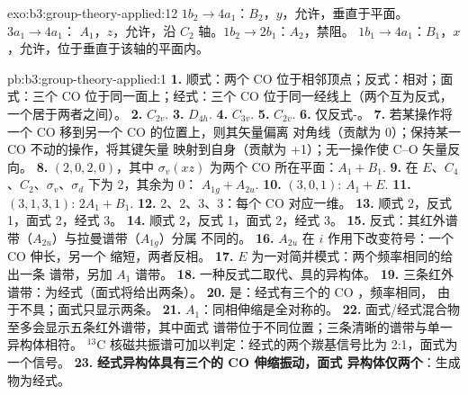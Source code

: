 \begin{solution}{exo:b3:group-theory-applied:12}
$1b_2 \to 4a_1$：$B_2$，$y$，允许，垂直于平面。$3a_1 \to 4a_1$：
$A_1$，$z$，允许，沿 $C_2$ 轴。$1b_2 \to 2b_1$：$A_2$，禁阻。
$1b_1 \to 4a_1$：$B_1$，$x$，允许，位于垂直于该轴的平面内。
\end{solution}

\begin{solution}{pb:b3:group-theory-applied:1}
\textbf{1.} 顺式：两个 CO 位于相邻顶点；反式：相对；面式：三个
CO 位于同一面上；经式：三个 CO 位于同一经线上（两个互为反式，一个居于两者之间）。
\textbf{2.} $C_{2v}$.
\textbf{3.} $D_{4h}$.
\textbf{4.} $C_{3v}$.
\textbf{5.} $C_{2v}$.
\textbf{6.} 仅反式-。
\textbf{7.} 若某操作将一个 CO 移到另一个 CO 的位置上，则其矢量偏离
对角线（贡献为 0）；保持某一 CO 不动的操作，将其键矢量
映射到自身（贡献为 +1）；无一操作使 C--O 矢量反向。
\textbf{8.}  $(2, 0, 2, 0)$，其中 $\sigma_v(xz)$ 为两个 CO 所在平面：$A_1 +
B_1$.
\textbf{9.} 在 $E$、$C_4$、$C_2$、$\sigma_v$、$\sigma_d$ 下为 2，其余为 0：
$A_{1g} + A_{2u}$.
\textbf{10.} $(3, 0, 1)$: $A_1 + E$.
\textbf{11.} $(3, 1, 3, 1)$: $2A_1 + B_1$.
\textbf{12.} 2、2、3、3：每个 CO 对应一维。
\textbf{13.} 顺式 2，反式 1，面式 2，经式 3。
\textbf{14.} 顺式 2，反式 1，面式 2，经式 3。
\textbf{15.} 反式：其红外谱带（$A_{2u}$）与拉曼谱带（$A_{1g}$）分属
不同的。
\textbf{16.} $A_{2u}$ 在 $i$ 作用下改变符号：一个 CO 伸长，另一个
缩短，两者反相。
\textbf{17.} $E$ 为一对简并模式：两个频率相同的给出一条
谱带，另加 $A_1$ 谱带。
\textbf{18.} 一种反式二取代、具的异构体。
\textbf{19.} 三条红外谱带：为经式（面式将给出两条）。
\textbf{20.} 是：经式有三个的 CO ，频率相同，
由于不具；面式只显示两条。
\textbf{21.} $A_1$：同相伸缩是全对称的。
\textbf{22.} 面式/经式混合物至多会显示五条红外谱带，其中面式
谱带位于不同位置；三条清晰的谱带与单一异构体相符。
${}^{13}$C 核磁共振谱可加以判定：经式的两个羰基信号比为
2:1，面式为一个信号。
\textbf{23.} \textbf{经式异构体具有三个的 CO 伸缩振动，面式
异构体仅两个}：生成物为经式。
\end{solution}
